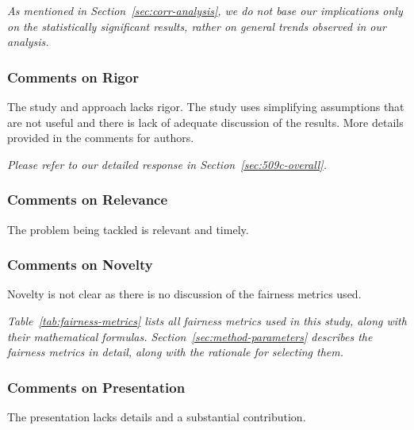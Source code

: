 \documentclass[conference]{IEEEtran}
\newcommand{\highlight}[1]{\begin{framed}%
  \noindent\emph{#1}
\end{framed}}
\begin{document}
\highlight{As mentioned in Section~\ref{sec:corr-analysis}, we do not
base our implications only on the statistically significant results,
rather on general trends observed in our analysis.}

\subsubsection{Comments on Rigor}

The study and approach lacks rigor. The study uses simplifying
assumptions that are not useful and there is lack of adequate
discussion of the results. More details provided in the comments for
authors.

\highlight{Please refer to our detailed response in
Section~\ref{sec:509c-overall}.}

\subsubsection{Comments on Relevance}
The problem being tackled is relevant and timely.

\subsubsection{Comments on Novelty}
Novelty is not clear as there is no discussion of the fairness metrics
used.

\highlight{Table~\ref{tab:fairness-metrics} lists all fairness metrics used in this study, along with their mathematical formulas. Section~\ref{sec:method-parameters} describes the fairness metrics in detail, along with the rationale for selecting them.}

\subsubsection{Comments on Presentation}
The presentation lacks details and a substantial contribution.

\end{document}
